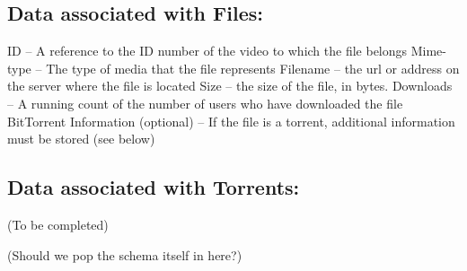 \documentclass[a4paper,12pt]{report}
\begin{document}
\subsection{Data associated with Files:}
	ID – A reference to the ID number of the video to which the file belongs
	Mime-type – The type of media that the file represents
	Filename – the url or address on the server where the file is located
	Size – the size of the file, in bytes.
	Downloads – A running count of the number of users who have downloaded the 		file
	BitTorrent Information (optional) – If the file is a torrent, additional information 		must be stored (see below)

\subsection{Data associated with Torrents:}
(To be completed)

(Should we pop the schema itself in here?)
\end{document}
